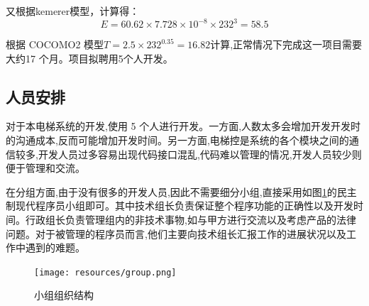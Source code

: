 又根据kemerer模型，计算得：
\begin{equation}
	\label{equ:e}
	E = 60.62\times 7.728\times 10^{-8}\times232^3 = 58.5
\end{equation}

根据 COCOMO2 模型$T = 2.5\times 232^{0.35} = 16.82$计算,正常情况下完成这一项目需要大约17 个月。项目拟聘用5个人开发。

\subsection{人员安排}
对于本电梯系统的开发,使用 5 个人进行开发。一方面,人数太多会增加开发开发时的沟通成本,反而可能增加开发时间。另一方面,电梯控是系统的各个模块之间的通信较多,开发人员过多容易出现代码接口混乱,代码难以管理的情况,开发人员较少则便于管理和交流。\par

在分组方面,由于没有很多的开发人员,因此不需要细分小组,直接采用如图\ref{fig:group}的民主制现代程序员小组即可。其中技术组长负责保证整个程序功能的正确性以及开发时间。行政组长负责管理组内的非技术事物,如与甲方进行交流以及考虑产品的法律问题。对于被管理的程序员而言,他们主要向技术组长汇报工作的进展状况以及工作中遇到的难题。
\begin{figure}[H]
	\centering
	\texttt{[image: resources/group.png]}
	\caption{小组组织结构}
	\label{fig:group}
\end{figure}

